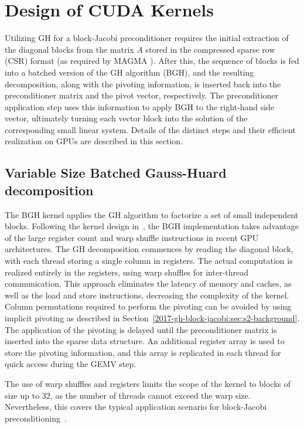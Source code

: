  \section{Design of CUDA Kernels}
 \label{2017-gh-block-jacobi:sec:s3-kernel}

Utilizing GH for a block-Jacobi preconditioner requires the initial extraction of the diagonal blocks
from the matrix $A$ stored in the compressed sparse row (CSR) format
(as required by MAGMA \cite{magma}).
After this, the sequence of blocks is fed into a batched version of the GH algorithm (BGH),
and the resulting decomposition, along with the pivoting information, is inserted back into the 
preconditioner matrix and the pivot vector, respectively.
The preconditioner application step uses this information to apply BGH
to the right-hand side vector, ultimately turning each vector block into the solution 
of the corresponding small linear system.
Details of the distinct steps and their efficient realization on GPUs are described
in this section.

\subsection{Variable Size Batched Gauss-Huard decomposition}
The BGH kernel applies the GH algorithm to factorize a set of small independent blocks. 
Following the kernel design in~\cite{gje},
the BGH implementation takes advantage of 
the large register count and warp shuffle instructions in recent GPU architectures.
The GH decomposition commences by reading the diagonal block,
with each thread storing a single column in registers.
The actual computation is realized entirely in the registers,
using warp shuffles for inter-thread communication.
This approach eliminates the latency of memory and caches,
as well as the load and store instructions, decreasing the complexity of the kernel.
Column permutations required to perform the pivoting can be avoided
by using implicit pivoting as described in Section~\ref{2017-gh-block-jacobi:sec:s2-background}.
The application of the pivoting is delayed until the preconditioner matrix is
inserted into the sparse data structure.
An additional register array is used to store the pivoting information,
and this array is replicated in each thread for quick access during the GEMV step.

The use of warp shuffles and registers limits the scope of the kernel to blocks
of size up to $32$, as the number of threads cannot exceed the warp size.
Nevertheless, this covers the typical application scenario for block-Jacobi preconditioning~\cite{gje}.

